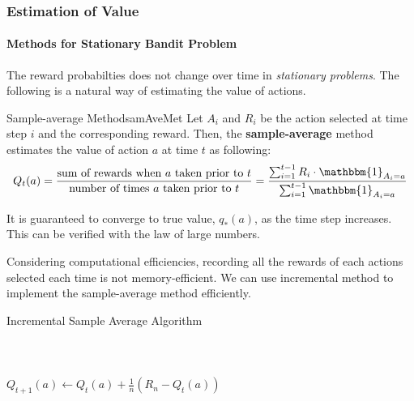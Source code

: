 \documentclass[../../main.tex]{subfiles}
\begin{document}
        \subsubsection{Estimation of Value}
            \paragraph{Methods for Stationary Bandit Problem}
            The reward probabilties does not change over time in \emph{stationary problems}. The following is a natural way of estimating the value of actions.
            \begin{defn}{Sample-average Method}{samAveMet}
                Let $A_i$ and $R_i$ be the action selected at time step $i$ and the corresponding reward. Then, the \textbf{sample-average} method
                estimates the value of action $a$ at time $t$ as following:
                \[
                Q_t(a)=\frac{\text{sum of rewards when $a$ taken prior to $t$}}{\text{number of times $a$ taken prior to $t$}}
                =\frac{\sum_{i=1}^{t-1}R_i \cdot \mathbbm{1}_{A_i=a}}{\sum_{i=1}^{t-1}\mathbbm{1}_{A_i=a}}
                \] 
            \end{defn}
            It is guaranteed to converge to true value, $q_*(a)$, as the time step increases. This can be verified with the law of large numbers.

            Considering computational efficiencies, recording all the rewards of each actions selected each time is not memory-efficient.
            We can use incremental method to implement the sample-average method efficiently.

            {Incremental Sample Average Algorithm}
            {
                \\
                \\
                \\
                \\
            }
            {
            }
            {
                $Q_{t+1}(a) \leftarrow Q_t(a) + \frac{1}{n}(R_n - Q_t(a))$\;
            }
\end{document}
